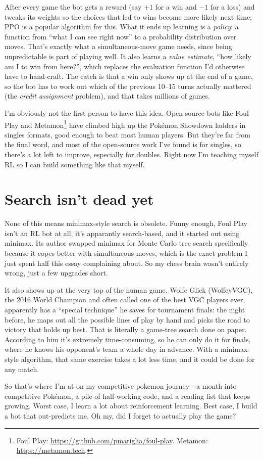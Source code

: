 \documentclass[11pt,a4paper]{article}
\begin{document}
After every game the bot gets a reward (say $+1$ for a win and $-1$ for a loss) and tweaks its weights so the choices that led to wins become more likely next time; PPO is a popular algorithm for this. What it ends up learning is a \emph{policy}: a function from ``what I can see right now'' to a probability distribution over moves. That's exactly what a simultaneous-move game needs, since being unpredictable is part of playing well. It also learns a \emph{value estimate}, ``how likely am I to win from here?'', which replaces the evaluation function I'd otherwise have to hand-craft. The catch is that a win only shows up at the end of a game, so the bot has to work out which of the previous 10--15 turns actually mattered (the \emph{credit assignment} problem), and that takes millions of games.

I'm obviously not the first person to have this idea. Open-source bots like Foul Play and Metamon\footnote{Foul Play: \url{https://github.com/pmariglia/foul-play}. Metamon: \url{https://metamon.tech}.} have climbed high up the Pok\'emon Showdown ladders in singles formats, good enough to beat most human players. But they're far from the final word, and most of the open-source work I've found is for singles, so there's a lot left to improve, especially for doubles. Right now I'm teaching myself RL so I can build something like that myself.

\section*{Search isn't dead yet}

None of this means minimax-style search is obsolete. Funny enough, Foul Play isn't an RL bot at all, it's apparantly search-based, and it started out using minimax. Its author swapped minimax for Monte Carlo tree search specifically because it copes better with simultaneous moves, which is the exact problem I just spent half this essay complaining about. So my chess brain wasn't entirely wrong, just a few upgrades short.

It also shows up at the very top of the human game. Wolfe Glick (WolfeyVGC), the 2016 World Champion and often called one of the best VGC players ever, apparently has a ``special technique'' he saves for tournament finals: the night before, he maps out all the possible lines of play by hand and picks the road to victory that holds up best. That is literally a game-tree search done on paper. According to him it's extremely time-consuming, so he can only do it for finals, where he knows his opponent's team a whole day in advance. With a minimax-style algorithm, that same exercise takes a lot less time, and it could be done for any match.

So that's where I'm at on my competitive pokemon journey - a month into competitive Pok\'emon, a pile of half-working code, and a reading list that keeps growing. Worst case, I learn a lot about reinforcement learning. Best case, I build a bot that out-predicts me. Oh my, did I forget to actually play the game?
\end{document}
